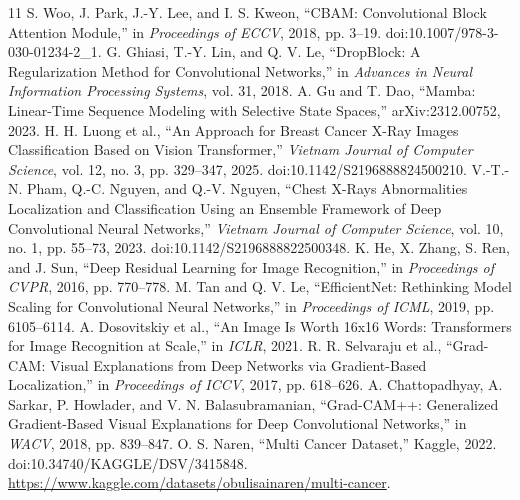 \begin{thebibliography}{11}
 S. Woo, J. Park, J.-Y. Lee, and I. S. Kweon, ``CBAM: Convolutional Block Attention Module,'' in \emph{Proceedings of ECCV}, 2018, pp. 3--19. doi:10.1007/978-3-030-01234-2\_1.
 G. Ghiasi, T.-Y. Lin, and Q. V. Le, ``DropBlock: A Regularization Method for Convolutional Networks,'' in \emph{Advances in Neural Information Processing Systems}, vol. 31, 2018.
 A. Gu and T. Dao, ``Mamba: Linear-Time Sequence Modeling with Selective State Spaces,'' arXiv:2312.00752, 2023.
 H. H. Luong et al., ``An Approach for Breast Cancer X-Ray Images Classification Based on Vision Transformer,'' \emph{Vietnam Journal of Computer Science}, vol. 12, no. 3, pp. 329--347, 2025. doi:10.1142/S2196888824500210.
 V.-T.-N. Pham, Q.-C. Nguyen, and Q.-V. Nguyen, ``Chest X-Rays Abnormalities Localization and Classification Using an Ensemble Framework of Deep Convolutional Neural Networks,'' \emph{Vietnam Journal of Computer Science}, vol. 10, no. 1, pp. 55--73, 2023. doi:10.1142/S2196888822500348.
 K. He, X. Zhang, S. Ren, and J. Sun, ``Deep Residual Learning for Image Recognition,'' in \emph{Proceedings of CVPR}, 2016, pp. 770--778.
 M. Tan and Q. V. Le, ``EfficientNet: Rethinking Model Scaling for Convolutional Neural Networks,'' in \emph{Proceedings of ICML}, 2019, pp. 6105--6114.
 A. Dosovitskiy et al., ``An Image Is Worth 16x16 Words: Transformers for Image Recognition at Scale,'' in \emph{ICLR}, 2021.
 R. R. Selvaraju et al., ``Grad-CAM: Visual Explanations from Deep Networks via Gradient-Based Localization,'' in \emph{Proceedings of ICCV}, 2017, pp. 618--626.
 A. Chattopadhyay, A. Sarkar, P. Howlader, and V. N. Balasubramanian, ``Grad-CAM++: Generalized Gradient-Based Visual Explanations for Deep Convolutional Networks,'' in \emph{WACV}, 2018, pp. 839--847.
 O. S. Naren, ``Multi Cancer Dataset,'' Kaggle, 2022. doi:10.34740/KAGGLE/DSV/3415848. \url{https://www.kaggle.com/datasets/obulisainaren/multi-cancer}.
\end{thebibliography}
